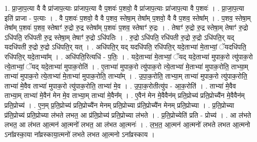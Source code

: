\documentclass[17pt]{extarticle}
\begin{document}
1. प्रा॒जा॒प॒त्या वै वै प्रा॑जाप॒त्याः प्रा॑जाप॒त्या वै प॒शवः॑ प॒शवो॒ वै प्रा॑जाप॒त्याः प्रा॑जाप॒त्या वै प॒शवः॑ । . प्रा॒जा॒प॒त्या इति॑ प्राजा - प॒त्याः । . वै प॒शवः॑ प॒शवो॒ वै वै प॒शव॒ स्तेषा॒म् तेषा᳚म् प॒शवो॒ वै वै प॒शव॒ स्तेषा᳚म् । . प॒शव॒ स्तेषा॒म् तेषा᳚म् प॒शवः॑ प॒शव॒ स्तेषाꣳ॑ रु॒द्रो रु॒द्र स्तेषा᳚म् प॒शवः॑ प॒शव॒ स्तेषाꣳ॑ रु॒द्रः । . तेषाꣳ॑ रु॒द्रो रु॒द्र स्तेषा॒म् तेषाꣳ॑ रु॒द्रो ऽधि॑पति॒ रधि॑पती रु॒द्र स्तेषा॒म् तेषाꣳ॑ रु॒द्रो ऽधि॑पतिः । . रु॒द्रो ऽधि॑पति॒ रधि॑पती रु॒द्रो रु॒द्रो ऽधि॑पति॒र् यद् यदधि॑पती रु॒द्रो रु॒द्रो ऽधि॑पति॒र् यत् । . अधि॑पति॒र् यद् यदधि॑पति॒ रधि॑पति॒र् यदे॒ताभ्या॑ मे॒ताभ्यां॒ ॅयदधि॑पति॒ रधि॑पति॒र् यदे॒ताभ्या᳚म् । . अधि॑पति॒रित्यधि॑ - प॒तिः॒ । . यदे॒ताभ्या॑ मे॒ताभ्यां॒ ॅयद् यदे॒ताभ्या॑ मुपाक॒रो त्यु॑पाक॒रो त्ये॒ताभ्यां॒ ॅयद् यदे॒ताभ्या॑ मुपाक॒रोति॑ । . ए॒ताभ्या॑ मुपाक॒रो त्यु॑पाक॒रो त्ये॒ताभ्या॑ मे॒ताभ्या॑ मुपाक॒रोति॒ ताभ्या॒म् ताभ्या॑ मुपाक॒रो त्ये॒ताभ्या॑ मे॒ताभ्या॑ मुपाक॒रोति॒ ताभ्या᳚म् । . उ॒पा॒क॒रोति॒ ताभ्या॒म् ताभ्या॑ मुपाक॒रो त्यु॑पाक॒रोति॒ ताभ्या॑ मे॒वैव ताभ्या॑ मुपाक॒रो त्यु॑पाक॒रोति॒ ताभ्या॑ मे॒व । . उ॒पा॒क॒रोतीत्यु॑प - आ॒क॒रोति॑ । . ताभ्या॑ मे॒वैव ताभ्या॒म् ताभ्या॑ मे॒वैन॑ मेन मे॒व ताभ्या॒म् ताभ्या॑ मे॒वैन᳚म् । . ए॒वैन॑ मेन मे॒वैवैन॑म् प्रति॒प्रोच्य॑ प्रति॒प्रोच्यै॑न मे॒वैवैन॑म् प्रति॒प्रोच्य॑ । . ए॒न॒म् प्र॒ति॒प्रोच्य॑ प्रति॒प्रोच्यै॑न मेनम् प्रति॒प्रोच्या प्र॑ति॒प्रोच्यै॑न मेनम् प्रति॒प्रोच्या । . प्र॒ति॒प्रोच्या प्र॑ति॒प्रोच्य॑ प्रति॒प्रोच्या ल॑भते लभत॒ आ प्र॑ति॒प्रोच्य॑ प्रति॒प्रोच्या ल॑भते । . प्र॒ति॒प्रोच्येति॑ प्रति - प्रोच्य॑ । . आ ल॑भते लभत॒ आ ल॑भत आ॒त्मन॑ आ॒त्मनो॑ लभत॒ आ ल॑भत आ॒त्मनः॑ । . ल॒भ॒त॒ आ॒त्मन॑ आ॒त्मनो॑ लभते लभत आ॒त्मनो ऽना᳚व्रस्का॒या ना᳚व्रस्काया॒त्मनो॑ लभते लभत आ॒त्मनो ऽना᳚व्रस्काय । \newline
\end{document}
